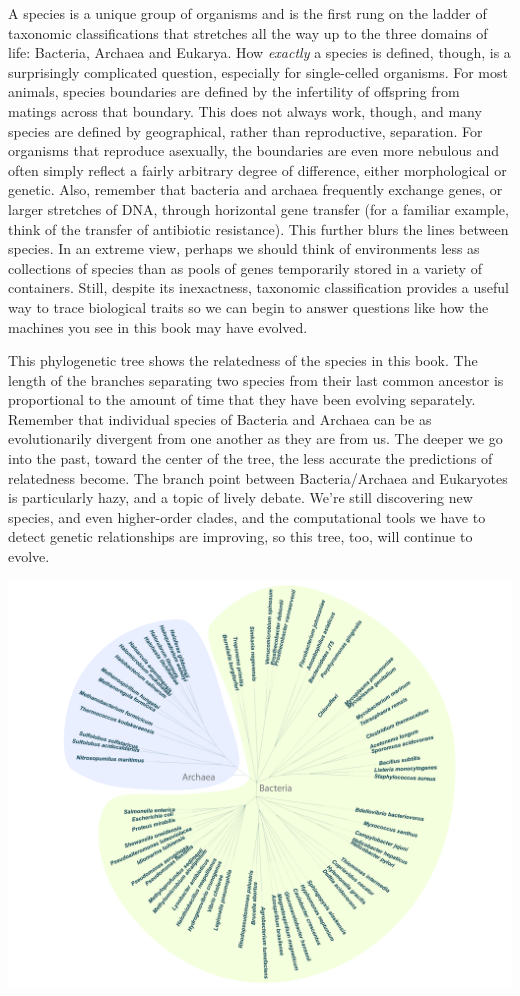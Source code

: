 \documentclass[]{tufte-book}
\begin{document}
A species is a unique group of organisms and is the first rung on the ladder of taxonomic classifications that stretches all the way up to the three domains of life: Bacteria, Archaea and Eukarya. How \emph{exactly} a species is defined, though, is a surprisingly complicated question, especially for single-celled organisms. For most animals, species boundaries are defined by the infertility of offspring from matings across that boundary. This does not always work, though, and many species are defined by geographical, rather than reproductive, separation. For organisms that reproduce asexually, the boundaries are even more nebulous and often simply reflect a fairly arbitrary degree of difference, either morphological or genetic. Also, remember that bacteria and archaea frequently exchange genes, or larger stretches of DNA, through horizontal gene transfer (for a familiar example, think of the transfer of antibiotic resistance). This further blurs the lines between species. In an extreme view, perhaps we should think of environments less as collections of species than as pools of genes temporarily stored in a variety of containers. Still, despite its inexactness, taxonomic classification provides a useful way to trace biological traits so we can begin to answer questions like how the machines you see in this book may have evolved.

This phylogenetic tree shows the relatedness of the species in this book. The length of the branches separating two species from their last common ancestor is proportional to the amount of time that they have been evolving separately. Remember that individual species of Bacteria and Archaea can be as evolutionarily divergent from one another as they are from us. The deeper we go into the past, toward the center of the tree, the less accurate the predictions of relatedness become. The branch point between Bacteria/Archaea and Eukaryotes is particularly hazy, and a topic of lively debate. We're still discovering new species, and even higher-order clades, and the computational tools we have to detect genetic relationships are improving, so this tree, too, will continue to evolve.

\includegraphics[width=23.06in]{img/Tree}
\end{document}
